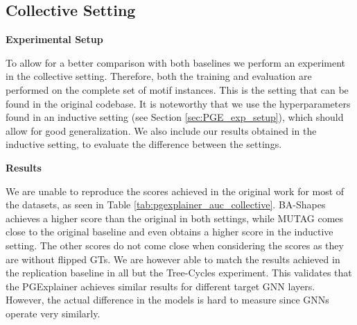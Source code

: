 

\subsection{Collective Setting}
\label{sec:coll_exp}

\textbf{Experimental Setup} \par
To allow for a better comparison with both baselines we perform an experiment in the collective setting. Therefore, both the training and evaluation are performed on the complete set of motif instances. This is the setting that can be found in the original codebase. It is noteworthy that we use the hyperparameters found in an inductive setting (see Section \ref{sec:PGE_exp_setup}), which should allow for good generalization. We also include our results obtained in the inductive setting, to evaluate the difference between the settings. \bigskip

\textbf{Results}\par

We are unable to reproduce the scores achieved in the original work for most of the datasets, as seen in Table \ref{tab:pgexplainer_auc_collective}. BA-Shapes achieves a higher score than the original in both settings, while MUTAG comes close to the original baseline and even obtains a higher score in the inductive setting. The other scores do not come close when considering the scores as they are without flipped \acp{GT}. We are however able to match the results achieved in the replication baseline in all but the Tree-Cycles experiment. This validates that the PGExplainer achieves similar results for different target GNN layers. However, the actual difference in the models is hard to measure since GNNs operate very similarly.

